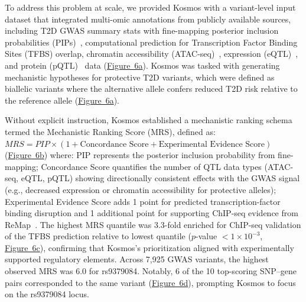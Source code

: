 \documentclass{article}
\begin{document}
To address this problem at scale, we provided Kosmos with a variant-level input dataset that integrated multi-omic annotations from publicly available sources, including T2D GWAS summary stats with fine-mapping posterior inclusion probabilities (PIPs)~\cite{mahajan_multi-ancestry_2022}, computational prediction for Transcription Factor Binding Sites (TFBS) overlap, chromatin accessibility (ATAC-seq)~\cite{wang_integrating_2023}, expression (eQTL)~\cite{the_gtex_consortium_gtex_2020}, and protein (pQTL)~\cite{sun_plasma_2023} data (\hyperref[fig:fig6]{Figure~6a}). Kosmos was tasked with generating mechanistic hypotheses for protective T2D variants, which were defined as biallelic variants where the alternative allele confers reduced T2D risk relative to the reference allele (\hyperref[fig:fig6]{Figure~6a}).

Without explicit instruction, Kosmos established a mechanistic ranking schema termed the Mechanistic Ranking Score (MRS), defined as: $MRS = PIP \times (1 + \text{Concordance Score} + \text{Experimental Evidence Score})$ (\hyperref[fig:fig6]{Figure~6b}) where: PIP represents the posterior inclusion probability from fine-mapping; Concordance Score quantifies the number of QTL data types (ATAC-seq, eQTL, pQTL) showing directionally consistent effects with the GWAS signal (e.g., decreased expression or chromatin accessibility for protective alleles); Experimental Evidence Score adds 1 point for predicted transcription-factor binding disruption and 1 additional point for supporting ChIP-seq evidence from ReMap~\cite{coetzee_motifbreakr_2024}. The highest MRS quantile was 3.3-fold enriched for ChIP-seq validation of the TFBS prediction relative to lowest quantile ($p$-value $< 1 \times 10^{-3}$, \hyperref[fig:fig6]{Figure~6c}), confirming that Kosmos’s prioritization aligned with experimentally supported regulatory elements. Across 7,925 GWAS variants, the highest observed MRS was 6.0 for rs9379084. Notably, 6 of the 10 top-scoring SNP–gene pairs corresponded to the same variant (\hyperref[fig:fig6]{Figure~6d}), prompting Kosmos to focus on the rs9379084 locus.
\end{document}
